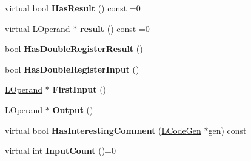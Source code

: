 \begin{DoxyCompactItemize}
\item 
virtual bool {\bfseries Has\+Result} () const  =0\hypertarget{classv8_1_1internal_1_1_l_instruction_af38ca7b40171f2ed75a2970ac7e15fd8}{}\label{classv8_1_1internal_1_1_l_instruction_af38ca7b40171f2ed75a2970ac7e15fd8}

\item 
virtual \hyperlink{classv8_1_1internal_1_1_l_operand}{L\+Operand} $\ast$ {\bfseries result} () const  =0\hypertarget{classv8_1_1internal_1_1_l_instruction_a3c5b856bb92c72dabcf08086abf6f8d7}{}\label{classv8_1_1internal_1_1_l_instruction_a3c5b856bb92c72dabcf08086abf6f8d7}

\item 
bool {\bfseries Has\+Double\+Register\+Result} ()\hypertarget{classv8_1_1internal_1_1_l_instruction_a543f5e4ff99e3d1ba02cb23ecb322de1}{}\label{classv8_1_1internal_1_1_l_instruction_a543f5e4ff99e3d1ba02cb23ecb322de1}

\item 
bool {\bfseries Has\+Double\+Register\+Input} ()\hypertarget{classv8_1_1internal_1_1_l_instruction_a24667d3c56cea0353d051a19753bb71c}{}\label{classv8_1_1internal_1_1_l_instruction_a24667d3c56cea0353d051a19753bb71c}

\item 
\hyperlink{classv8_1_1internal_1_1_l_operand}{L\+Operand} $\ast$ {\bfseries First\+Input} ()\hypertarget{classv8_1_1internal_1_1_l_instruction_ad9675d1c06250b28199f105835b80329}{}\label{classv8_1_1internal_1_1_l_instruction_ad9675d1c06250b28199f105835b80329}

\item 
\hyperlink{classv8_1_1internal_1_1_l_operand}{L\+Operand} $\ast$ {\bfseries Output} ()\hypertarget{classv8_1_1internal_1_1_l_instruction_ac4116b2faee2d8d3f0d7d21a27b40ad4}{}\label{classv8_1_1internal_1_1_l_instruction_ac4116b2faee2d8d3f0d7d21a27b40ad4}

\item 
virtual bool {\bfseries Has\+Interesting\+Comment} (\hyperlink{classv8_1_1internal_1_1_l_code_gen}{L\+Code\+Gen} $\ast$gen) const \hypertarget{classv8_1_1internal_1_1_l_instruction_affae35afdf10150a226c035d47b8ce27}{}\label{classv8_1_1internal_1_1_l_instruction_affae35afdf10150a226c035d47b8ce27}

\item 
virtual int {\bfseries Input\+Count} ()=0\hypertarget{classv8_1_1internal_1_1_l_instruction_a10b5af4413b64db11db6f4dc266b5e4f}{}\label{classv8_1_1internal_1_1_l_instruction_a10b5af4413b64db11db6f4dc266b5e4f}


\end{DoxyCompactItemize}
